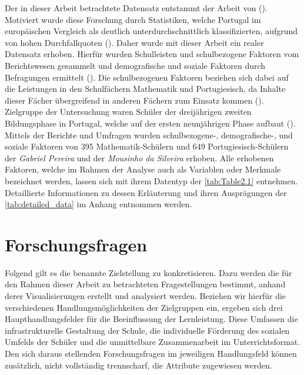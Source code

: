 Der in dieser Arbeit betrachtete Datensatz entstammt der Arbeit von (\cite[]{Cortez2008UsingDM}).
Motiviert wurde diese Forschung durch Statistiken, welche Portugal im europäischen Vergleich als deutlich unterdurchschnittlich klassifizierten, aufgrund von hohen Durchfallquoten (\cite[S. 1]{Cortez2008UsingDM}).
Daher wurde mit dieser Arbeit ein realer Datensatz erhoben.
Hierfür wurden Schulleisten und schulbezogene Faktoren vom Berichtswesen gesammelt und demografische und soziale Faktoren durch Befragungen ermittelt (\cite[S. 1]{Cortez2008UsingDM}).
Die schulbezogenen Faktoren beziehen sich dabei auf die Leistungen in den Schulfächern Mathematik und Portugiesisch, da Inhalte dieser Fächer übergreifend in anderen Fächern zum Einsatz kommen (\cite[S. 2]{Cortez2008UsingDM}).
Zielgruppe der Untersuchung waren Schüler der dreijährigen zweiten Bildungsphase in Portugal, welche auf der ersten neunjährigen Phase aufbaut (\cite[S. 2]{Cortez2008UsingDM}).
Mittels der Berichte und Umfragen wurden schulbezogene-, demografische-, und soziale Faktoren von 395 Mathematik-Schülern und 649 Portugiesisch-Schülern der \textit{Gabriel Pereira} und der \textit{Mousinho da Silveira} erhoben.
Alle erhobenen Faktoren, welche im Rahmen der Analyse auch als Variablen oder Merkmale bezeichnet werden, lassen sich mit ihrem Datentyp der \autoref{tab:Table2.1} entnehmen. 
Detaillierte Informationen zu dessen Erläuterung und ihren Ausprägungen der \autoref{tab:detailed_data} im Anhang entnommen werden.




\section[Forschungsfragen]{Forschungsfragen}

Folgend gilt es die benannte Zielstellung zu konkretisieren. 
Dazu werden die für den Rahmen dieser Arbeit zu betrachteten Fragestellungen bestimmt, anhand derer Visualisierungen erstellt und analysiert werden.
Beziehen wir hierfür die verschiedenen Handlungsmöglichkeiten der Zielgruppen ein, ergeben sich drei Haupthandlungsfelder für die Beeinflussung der Lernleistung.
Diese Umfassen die infrastrukturelle Gestaltung der Schule, die individuelle Förderung des sozialen Umfelds der Schüler und die unmittelbare Zusammenarbeit im Unterrichtsformat.
Den sich daraus stellenden Forschungsfragen im jeweiligen Handlungsfeld können zusätzlich, nicht vollständig trennscharf, die Attribute zugewiesen werden.

